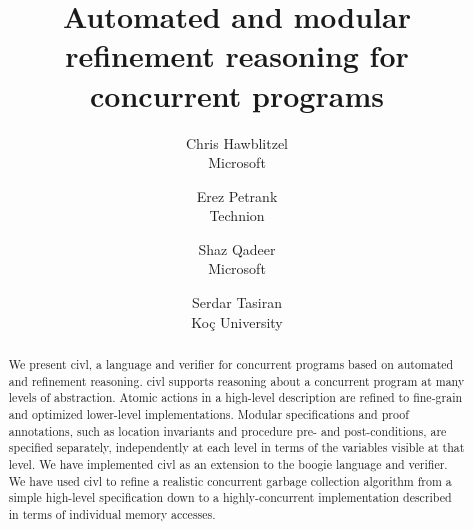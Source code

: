 \documentclass[twocolumn]{article}
\theoremstyle{remark}
\theoremstyle{definition}
\newcommand{\civl}{{\sc civl}\xspace}
\newcommand{\boogie}{{\sc boogie}\xspace}
\begin{document}
\title{Automated and modular refinement reasoning for concurrent programs}
\author{Chris Hawblitzel \\ Microsoft \and Erez Petrank \\ Technion \and Shaz Qadeer \\ Microsoft \and Serdar Tasiran \\ Ko\c{c} University}
\date{}

\maketitle



\begin{abstract}
We present \civl, a language and verifier for concurrent programs based on automated and refinement reasoning.  
\civl supports reasoning about a concurrent program at many levels of abstraction. 
Atomic actions in a high-level description are refined to fine-grain and optimized lower-level implementations. 
Modular specifications and proof annotations, such as location invariants and procedure pre- and post-conditions, 
are specified separately, independently at each level in terms of the variables visible at that level. 
We have implemented \civl as an extension to the \boogie language and verifier.
We have used \civl to refine a realistic concurrent garbage collection algorithm
from a simple high-level specification down to a highly-concurrent implementation described in terms of individual memory accesses.
\end{abstract}













\end{document}
